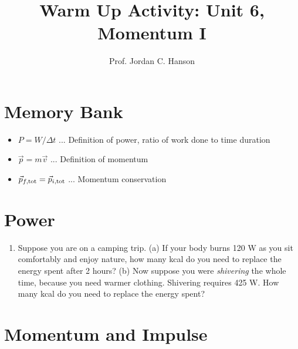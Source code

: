 \documentclass{article}
\begin{document}
\twocolumn

\title{Warm Up Activity: Unit 6, Momentum I}
\author{Prof. Jordan C. Hanson}

\maketitle

\section{Memory Bank}

\begin{itemize}
\item $P = W / \Delta t$ ... Definition of power, ratio of work done to time duration
\item $\vec{p} = m \vec{v}$ ... Definition of momentum
\item $\vec{p}_{f,\rm tot} = \vec{p}_{i,\rm tot}$ ... Momentum conservation
\end{itemize}

\section{Power}

\begin{enumerate}
\item Suppose you are on a camping trip.  (a) If your body burns 120 W as you sit comfortably and enjoy nature, how many kcal do you need to replace the energy spent after 2 hours? (b) Now suppose you were \textit{shivering} the whole time, because you need warmer clothing.  Shivering requires 425 W.  How many kcal do you need to replace the energy spent? \\ \vspace{2cm}
\end{enumerate}

\section{Momentum and Impulse}
\end{document}

